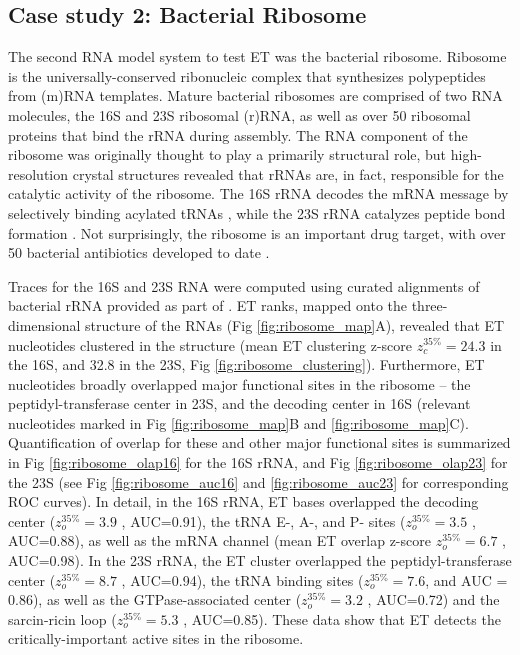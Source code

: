 \documentclass[12pt,a4paper]{report}
\begin{document}
\subsection{Case study 2: Bacterial Ribosome}
The second RNA model system to test ET was the bacterial ribosome. Ribosome is the universally-conserved ribonucleic complex that synthesizes polypeptides from (m)RNA templates. Mature bacterial ribosomes are comprised of two RNA molecules, the 16S and 23S ribosomal (r)RNA, as well as over 50 ribosomal proteins that bind the rRNA during assembly. The RNA component of the ribosome was originally thought to play a primarily structural role, but high-resolution crystal structures revealed that rRNAs are, in fact, responsible for the catalytic activity of the ribosome. The 16S rRNA decodes the mRNA message by selectively binding acylated tRNAs \cite{Demeshkina2012}, while the 23S rRNA catalyzes peptide bond formation \cite{Beringer2007}. Not surprisingly, the ribosome is an important drug target, with over 50 bacterial antibiotics developed to date \cite{Howe2015}.


Traces for the 16S and 23S RNA were computed using curated alignments of bacterial rRNA provided as part of \cite{Petrov2014}. ET ranks, mapped onto the three-dimensional structure of the RNAs (Fig \ref{fig:ribosome_map}A), revealed that ET nucleotides clustered in the structure (mean ET clustering z-score $z_{c}^{35\%}=24.3$  in the 16S, and 32.8 in the 23S, Fig \ref{fig:ribosome_clustering}). Furthermore, ET nucleotides broadly overlapped major functional sites in the ribosome – the peptidyl-transferase center in 23S, and the decoding center in 16S (relevant nucleotides marked in Fig \ref{fig:ribosome_map}B and \ref{fig:ribosome_map}C). Quantification of overlap for these and other major functional sites is summarized in Fig \ref{fig:ribosome_olap16} for the 16S rRNA, and Fig \ref{fig:ribosome_olap23} for the 23S (see Fig \ref{fig:ribosome_auc16} and \ref{fig:ribosome_auc23} for corresponding ROC curves). In detail, in the 16S rRNA, ET bases overlapped the decoding center ($z_{o}^{35\%}=3.9$ , AUC=0.91), the tRNA E-, A-, and P- sites ($z_{o}^{35\%}=3.5$ , AUC=0.88), as well as the mRNA channel (mean ET overlap z-score $z_{o}^{35\%}=6.7$ , AUC=0.98). In the 23S rRNA, the ET cluster overlapped the peptidyl-transferase center ($z_{o}^{35\%}=8.7$ , AUC=0.94), the tRNA binding sites ($z_{o}^{35\%}=7.6$, and AUC = 0.86), as well as the GTPase-associated center ($z_{o}^{35\%}=3.2$ , AUC=0.72) and the sarcin-ricin loop ($z_{o}^{35\%}=5.3$ , AUC=0.85). These data show that ET detects the critically-important active sites in the ribosome.
\end{document}
